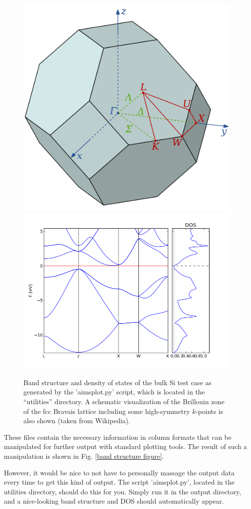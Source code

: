 \begin{figure}
\begin{center}
\includegraphics[height=4 cm]{fcc_Brillouin_zone.png}
\includegraphics[height=9 cm]{Si_band_structure_and_DOS_reference}
\end{center}
\caption{Band structure and density of states of the bulk Si test case
         as generated by the 'aimsplot.py' script, which is located in the ``utilities''
         directory. A schematic visualization of the Brillouin zone of
         the fcc Bravais lattice including some high-symmetry $k$-points is
         also shown (taken from Wikipedia).} 
\label{band structure figure}
\end{figure}

These files contain the necessary information in column formats that
can be manipulated for further output with standard plotting
tools. The result of such a manipulation is shown in Fig. \ref{band
  structure figure}. 

However, it would be nice to not have to personally massage the output
data every time to get this kind of output. The script 'aimsplot.py',
located in the utilities directory, should do this for you. Simply run
it in the output directory, and a nice-looking band structure and DOS
should automatically appear. 


